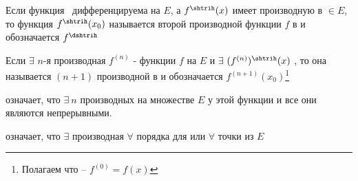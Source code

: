 \begin{defs}
	Если функция \fx \ дифференцируема на $E$, а $f^{\shtrih}(x)$ имеет производную в  $\in E$, то функция $f^{\shtrih}(x_0)$ называется второй производной функции $f$ в  и обозначается $f^{\dshtrih}$

	Если $\exists$ $n$-я производная $f^{(n)}$ - функции $f$ на $E$ и $\exists$ $(f^{(n)})^{\shtrih}(x)$ , то она называется $(n+1)$ производной в  и обозначается $f^{(n+1)}(x_0)$\footnote{Полагаем что -- $f^{(0)}=f(x)$}

	 означает, что $\exists \ n$ производных на множестве $E$ у этой функции и все они являются непрерывными.

	  означает, что $\exists$ производная $\forall$ порядка для  или $\forall$ точки из $E$
\end{defs}

